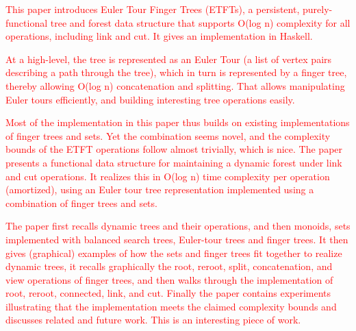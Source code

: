 \documentclass{elsarticle}
\newcommand{\tcr} [1]{\textcolor{red}{#1}}
\begin{document}
\tcr{This paper introduces Euler Tour Finger Trees (ETFTs), a persistent, purely-functional tree and forest data structure that supports O(log n) complexity for all operations, including link and cut. It gives an implementation in Haskell.}

\tcr{At a high-level, the tree is represented as an Euler Tour (a list of vertex pairs describing a path through the tree), which in turn is represented by a finger tree, thereby allowing O(log n) concatenation and splitting. That allows manipulating Euler tours efficiently, and building interesting tree operations easily.}

\tcr{Most of the implementation in this paper thus builds on existing implementations of finger trees and sets. Yet the combination seems novel, and the complexity bounds of the ETFT operations follow almost trivially, which is nice.
The paper presents a functional data structure for maintaining a dynamic forest under link and cut operations. It realizes this in O(log n) time complexity per operation (amortized), using an Euler tour tree representation implemented using a combination of finger trees and sets. }

\tcr{The paper first recalls dynamic trees and their operations, and then monoids, sets implemented with balanced search trees, Euler-tour trees and finger trees. It then gives (graphical) examples of how the sets and finger trees fit together to realize dynamic trees, it recalls graphically the root, reroot, split, concatenation, and view operations of finger trees, and then walks through the implementation of root, reroot, connected, link, and cut.
Finally the paper contains experiments illustrating that the implementation meets the claimed complexity bounds and discusses related and future work.
This is an interesting piece of work.}




%

 

 

 

 



%
\end{document}

